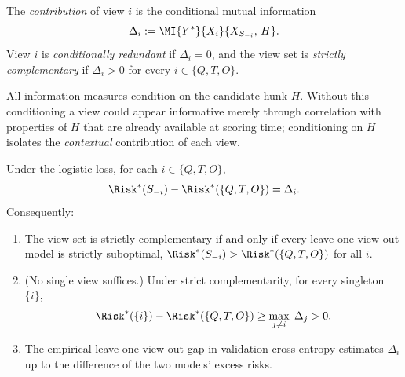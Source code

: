 \begin{definition}
\label{def:contribution}
The \emph{contribution} of view $i$ is the conditional mutual information
\begin{equation}
  \Delta_i := \MI{Y^\ast}{X_i}{X_{S_{-i}},\, H} .
\end{equation}
View $i$ is \emph{conditionally redundant} if $\Delta_i = 0$, and the view set is \emph{strictly complementary} if $\Delta_i > 0$ for every $i \in \{Q, T, O\}$.
\end{definition}

\noindent
All information measures condition on the candidate hunk $H$. Without this conditioning a view could appear informative merely through correlation with properties of $H$ that are already available at scoring time; conditioning on $H$ isolates the \emph{contextual} contribution of each view.

\begin{theorem}
\label{thm:complementarity}
Under the logistic loss, for each $i \in \{Q, T, O\}$,
\begin{equation}
  \Risk^\ast(S_{-i}) - \Risk^\ast(\{Q, T, O\}) = \Delta_i.
  \label{eq:thm2-main}
\end{equation}
Consequently:
\begin{enumerate}
  \item[\textup{(a)}] The view set is strictly complementary if and only if every leave-one-view-out model is strictly suboptimal, $\Risk^\ast(S_{-i}) > \Risk^\ast(\{Q,T,O\})$ for all $i$.

  \item[\textup{(b)}] \textup{(No single view suffices.)} Under strict complementarity, for every singleton $\{i\}$,
  \begin{equation}
    \Risk^\ast(\{i\}) - \Risk^\ast(\{Q,T,O\}) \geq \max_{j \neq i}\; \Delta_j > 0 .
  \end{equation}

  \item[\textup{(c)}] The empirical leave-one-view-out gap in validation cross-entropy estimates $\Delta_i$ up to the difference of the two models' excess risks.
\end{enumerate}
\end{theorem}

